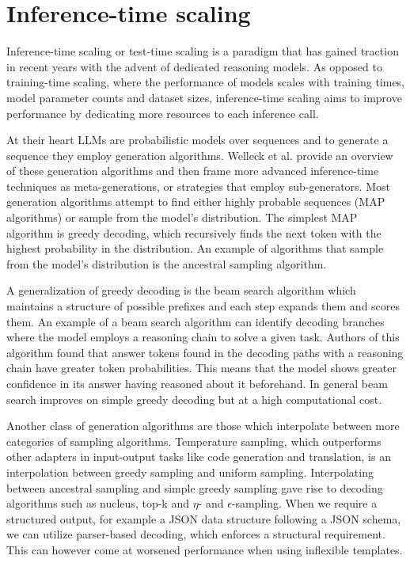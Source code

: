 \section{Inference-time scaling}\label{sec:inference}
Inference-time scaling or test-time scaling is a paradigm that has gained traction in recent years
with the advent of dedicated reasoning models\cite{openai2024openaio1card}\cite{deepseekai2025deepseekr1incentivizingreasoningcapability}. 
As opposed to training-time scaling, where the performance of models scales with 
training times, model parameter counts and dataset sizes\cite{kaplan2020scalinglawsneurallanguage},
inference-time scaling aims to improve performance by dedicating more resources to each inference call.

At their heart LLMs are probabilistic models over sequences and to generate a sequence they employ generation algorithms. 
Welleck et al.\cite{welleck2024decodingmetagenerationinferencetimealgorithms} provide an overview of these generation algorithms
and then frame more advanced inference-time techniques as meta-generations, or strategies that employ sub-generators.
Most generation algorithms attempt to find either highly probable sequences (MAP algorithms) or sample from the model's distribution.
The simplest MAP algorithm is greedy decoding, which recursively finds the next token with the highest probability in the distribution.
An example of algorithms that sample from the model's distribution is the ancestral sampling algorithm.

A generalization of greedy decoding is the beam search algorithm which maintains a structure of possible prefixes and each step expands them and scores them.
An example\cite{wang2024chainofthoughtreasoningprompting} of a beam search algorithm can identify decoding branches where the model 
employs a reasoning chain to solve a given task. Authors of this algorithm found that answer tokens found in the decoding paths with a reasoning chain 
have greater token probabilities. This means that the model shows greater confidence in its answer having reasoned about it beforehand.
In general beam search improves on simple greedy decoding but at a high computational cost\cite{welleck2024decodingmetagenerationinferencetimealgorithms}.

Another class of generation algorithms are those which interpolate between more categories of sampling algorithms.
Temperature sampling, which outperforms other adapters in input-output tasks like code generation and translation,
is an interpolation between greedy sampling and uniform sampling. 
Interpolating between ancestral sampling and simple greedy sampling gave rise to decoding algorithms such as
nucleus, top-k and $\eta$- and $\epsilon$-sampling\cite{welleck2024decodingmetagenerationinferencetimealgorithms}. When we require a structured output, for example a JSON data 
structure following a JSON schema, we can utilize parser-based decoding, which enforces a structural requirement.
This can however come at worsened performance when using inflexible templates.

